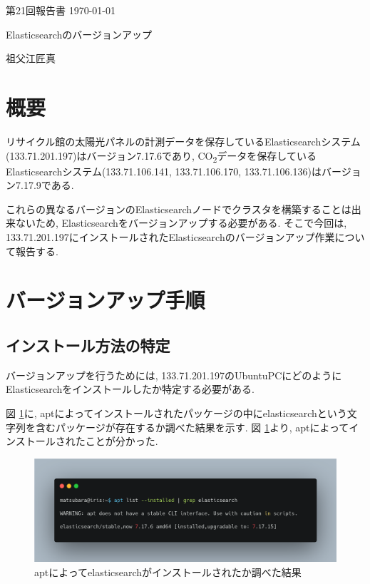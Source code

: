 \documentclass[a4j,12pt,]{jarticle}
\begin{document}
{\noindent\small 第21回報告書 \hfill\today}
\begin{center}
  {\Large Elasticsearchのバージョンアップ}
\end{center}
\begin{flushright}
  祖父江匠真 \\
\end{flushright}

\section{概要}
リサイクル館の太陽光パネルの計測データを保存しているElasticsearchシステム(133.71.201.197)はバージョン7.17.6であり, CO\textsubscript{2}データを保存しているElasticsearchシステム(133.71.106.141, 133.71.106.170, 133.71.106.136)はバージョン7.17.9である.

これらの異なるバージョンのElasticsearchノードでクラスタを構築することは出来ないため, Elasticsearchをバージョンアップする必要がある. そこで今回は, 133.71.201.197にインストールされたElasticsearchのバージョンアップ作業について報告する.

\section{バージョンアップ手順}

\subsection{インストール方法の特定}

バージョンアップを行うためには, 133.71.201.197のUbuntuPCにどのようにElasticsearchをインストールしたか特定する必要がある.

図 \ref{p1}に, aptによってインストールされたパッケージの中にelasticsearchという文字列を含むパッケージが存在するか調べた結果を示す.
図 \ref{p1}より, aptによってインストールされたことが分かった.

\begin{figure}[H]
  \begin{center}
    \includegraphics[width=160mm]{apt-grep.png}
    \caption{aptによってelasticsearchがインストールされたか調べた結果}
    \label{p1}
  \end{center}
\end{figure}
\end{document}
